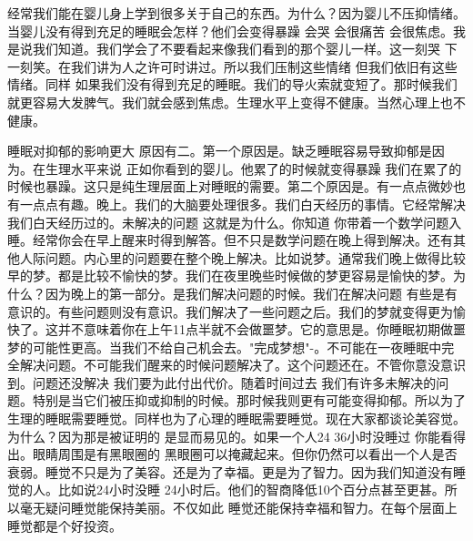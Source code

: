 经常我们能在婴儿身上学到很多关于自己的东西。为什么？因为婴儿不压抑情绪。当婴儿没有得到充足的睡眠会怎样？他们会变得暴躁 会哭 会很痛苦 会很焦虑。我是说我们知道。我们学会了不要看起来像我们看到的那个婴儿一样。这一刻哭 下一刻笑。在我们讲为人之许可时讲过。所以我们压制这些情绪 但我们依旧有这些情绪。同样 如果我们没有得到充足的睡眠。我们的导火索就变短了。那时候我们就更容易大发脾气。我们就会感到焦虑。生理水平上变得不健康。当然心理上也不健康。 

睡眠对抑郁的影响更大 原因有二。第一个原因是。缺乏睡眠容易导致抑郁是因为。在生理水平来说 正如你看到的婴儿。他累了的时候就变得暴躁 我们在累了的时候也暴躁。这只是纯生理层面上对睡眠的需要。第二个原因是。有一点点微妙也有一点点有趣。晚上。我们的大脑要处理很多。我们白天经历的事情。它经常解决我们白天经历过的。未解决的问题 这就是为什么。你知道 你带着一个数学问题入睡。经常你会在早上醒来时得到解答。但不只是数学问题在晚上得到解决。还有其他人际问题。内心里的问题要在整个晚上解决。比如说梦。通常我们晚上做得比较早的梦。都是比较不愉快的梦。我们在夜里晚些时候做的梦更容易是愉快的梦。为什么？因为晚上的第一部分。是我们解决问题的时候。我们在解决问题 有些是有意识的。有些问题则没有意识。我们解决了一些问题之后。我们的梦就变得更为愉快了。这并不意味着你在上午11点半就不会做噩梦。它的意思是。你睡眠初期做噩梦的可能性更高。当我们不给自己机会去。"完成梦想"-。不可能在一夜睡眠中完全解决问题。不可能我们醒来的时候问题解决了。这个问题还在。不管你意没意识到。问题还没解决 我们要为此付出代价。随着时间过去 我们有许多未解决的问题。特别是当它们被压抑或抑制的时候。那时候我则更有可能变得抑郁。所以为了生理的睡眠需要睡觉。同样也为了心理的睡眠需要睡觉。现在大家都谈论美容觉。为什么？因为那是被证明的 是显而易见的。如果一个人24 36小时没睡过 你能看得出。眼睛周围是有黑眼圈的 黑眼圈可以掩藏起来。但你仍然可以看出一个人是否衰弱。睡觉不只是为了美容。还是为了幸福。更是为了智力。因为我们知道没有睡觉的人。比如说24小时没睡 24小时后。他们的智商降低10个百分点甚至更甚。所以毫无疑问睡觉能保持美丽。不仅如此 睡觉还能保持幸福和智力。在每个层面上睡觉都是个好投资。 


